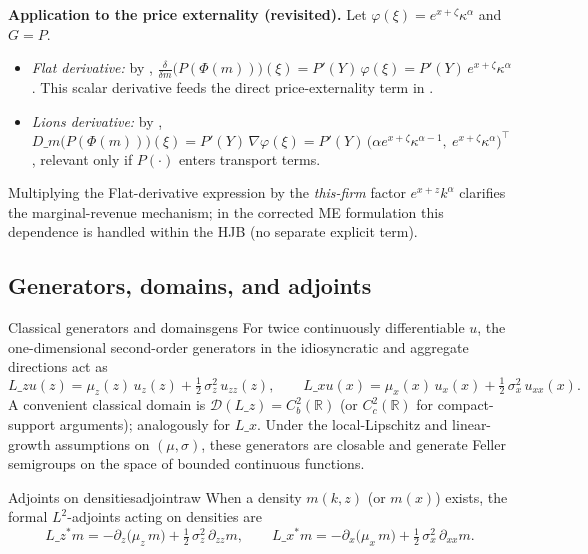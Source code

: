 ﻿\documentclass[11pt,letterpaper,oneside]{article}
\numberwithin{equation}{section}
\newcommand{\R}{\mathbb{R}}
\newcommand{\1}{\mathbf{1}}
\newcommand{\Lz}{L\_z}
\newcommand{\Lx}{L\_x}
\newcommand{\Lzadj}{L\_z^{\!*}}
\newcommand{\Dm}{D\_m}
\begin{document}
\begin{tcolorbox}[mathstyle]
\textbf{Application to the price externality (revisited).} Let $\varphi(\xi)=e^{x+\zeta}\kappa^\alpha$ and $G=P$.
\begin{itemize}[leftmargin=1.15em,itemsep=0.25em]
  \item \emph{Flat derivative:} by , $\tfrac{\delta}{\delta m}\big(P(\Phi(m))\big)(\xi)=P'(Y)\,\varphi(\xi)=P'(Y)\,e^{x+\zeta}\kappa^\alpha$. This scalar derivative feeds the direct price-externality term in .
  \item \emph{Lions derivative:} by , $\Dm\big(P(\Phi(m))\big)(\xi)=P'(Y)\,\nabla\varphi(\xi)=P'(Y)\,\big(\alpha e^{x+\zeta}\kappa^{\alpha-1},\ e^{x+\zeta}\kappa^\alpha\big)^{\!\top}$, relevant only if $P(\cdot)$ enters transport terms.
\end{itemize}
Multiplying the Flat-derivative expression by the \emph{this-firm} factor $e^{x+z}k^\alpha$ clarifies the marginal-revenue mechanism; in the corrected ME formulation this dependence is handled within the HJB (no separate explicit term).
\end{tcolorbox}

\subsection{Generators, domains, and adjoints}\label{sec:generators}

\begin{definition}{Classical generators and domains}{gens}
For twice continuously differentiable $u$, the one-dimensional second-order generators in the idiosyncratic and aggregate directions act as
\[
\Lz u(z)=\mu_z(z)\,u_z(z)+\tfrac12\,\sigma_z^2\,u_{zz}(z),\qquad
\Lx u(x)=\mu_x(x)\,u_x(x)+\tfrac12\,\sigma_x^2\,u_{xx}(x).
\]
A convenient classical domain is $\mathcal D(\Lz)=C_b^2(\R)$ (or $C_c^2(\R)$ for compact-support arguments); analogously for $\Lx$. Under the local-Lipschitz and linear-growth assumptions on $(\mu,\sigma)$, these generators are closable and generate Feller semigroups on the space of bounded continuous functions.
\end{definition}

\begin{definition}{Adjoints on densities}{adjointraw}
When a density $m(k,z)$ (or $m(x)$) exists, the formal $L^2$-adjoints acting on densities are
\[
\Lzadj m = -\partial_z\big(\mu_z\, m\big) + \tfrac12\, \sigma_z^2\, \partial_{zz} m,\qquad
\Lx^{\!*} m = -\partial_x\big(\mu_x\, m\big) + \tfrac12\, \sigma_x^2\, \partial_{xx} m.
\]
\end{definition}
\end{document}
